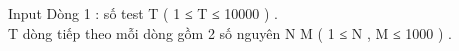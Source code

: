 Input
Dòng 1 : số test T ( 1 ≤ T ≤ 10000 ) .   
\\   T dòng tiếp theo mỗi dòng gồm 2 số nguyên N M ( 1 ≤ N , M ≤ 1000 ) .